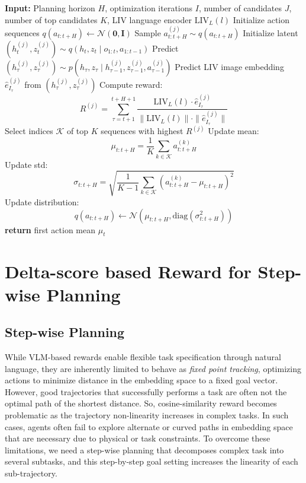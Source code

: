 \documentclass[11pt]{article}
\begin{document}
\begin{algorithm}
\caption{Sampling based MPC (CEM) with LIVerse}
\label{alg:cem_liv}
\begin{algorithmic}[1]
\State\textbf{Input:} Planning horizon $H$, optimization iterations $I$, number of candidates $J$, number of top candidates $K$, LIV language encoder $\mathrm{LIV}_L(l)$
\State Initialize action sequences $q(a_{t:t+H}) \leftarrow \mathcal{N}(\mathbf{0}, \mathbf{I})$
        \State Sample $a_{t:t+H}^{(j)} \sim q(a_{t:t+H})$
        \State Initialize latent $(h_t^{(j)}, z_t^{(j)}) \sim q(h_t, z_t \mid o_{1:t}, a_{1:t-1})$
            \State Predict $(h_\tau^{(j)}, z_\tau^{(j)}) \sim p(h_\tau, z_\tau \mid h_{\tau-1}^{(j)}, z_{\tau-1}^{(j)}, a_{\tau-1}^{(j)})$
            \State Predict LIV image embedding $\hat{e}_{I_\tau}^{(j)}$ from $(h_\tau^{(j)}, z_\tau^{(j)})$
        \EndFor
        \State Compute reward:
        \[
        R^{(j)} = \sum_{\tau = t+1}^{t+H+1} \frac{\mathrm{LIV}_L(l) \cdot \hat{e}_{I_\tau}^{(j)}}{\|\mathrm{LIV}_L(l)\| \cdot \|\hat{e}_{I_\tau}^{(j)}\|}
        \]
    \EndFor
    \State Select indices $\mathcal{K}$ of top $K$ sequences with highest $R^{(j)}$
    \State Update mean:
    \[
    \mu_{t:t+H} = \frac{1}{K} \sum_{k \in \mathcal{K}} a_{t:t+H}^{(k)}
    \]
    \State Update std:
    \[
    \sigma_{t:t+H} = \sqrt{ \frac{1}{K-1} \sum_{k \in \mathcal{K}} (a_{t:t+H}^{(k)} - \mu_{t:t+H})^2 }
    \]
    \State Update distribution:
    \[
    q(a_{t:t+H}) \leftarrow \mathcal{N}(\mu_{t:t+H}, \mathrm{diag}(\sigma_{t:t+H}^2))
    \]
\EndFor
\State \textbf{return} first action mean $\mu_t$
\end{algorithmic}
\end{algorithm}

\section{Delta-score based Reward for Step-wise Planning}

\subsection{Step-wise Planning}
While VLM-based rewards enable flexible task specification through natural language, they are inherently limited to behave as \textit{fixed point tracking}, optimizing actions to minimize distance in the embedding space to a fixed goal vector. However, good trajectories that successfully performs a task are often not the optimal path of the shortest distance.
So, cosine-similarity reward becomes problematic as the trajectory non-linearity increases in complex tasks. In such cases, agents often fail to explore alternate or curved paths in embedding space that are necessary due to physical or task constraints. 
To overcome these limitations, we need a step-wise planning that decomposes complex task into several subtasks, and this step-by-step goal setting increases the linearity of each sub-trajectory.
\end{document}

